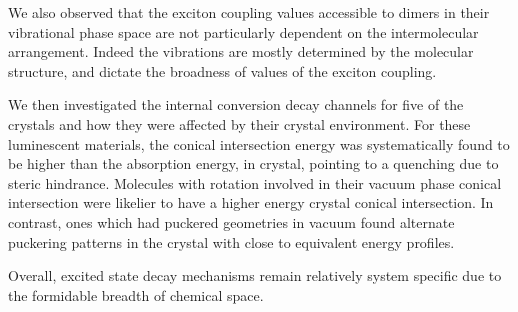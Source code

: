 We also observed that the exciton coupling values accessible to dimers in their vibrational phase space are not particularly dependent on the intermolecular arrangement. Indeed the vibrations are mostly determined by the molecular structure, and dictate the broadness of values of the exciton coupling.

We then investigated the internal conversion decay channels for five of the crystals and how they were affected by their crystal environment. For these luminescent materials, the conical intersection energy was systematically found to be higher than the absorption energy, in crystal, pointing to a quenching due to steric hindrance. Molecules with rotation involved in their vacuum phase conical intersection were likelier to have a higher energy crystal conical intersection. In contrast, ones which had puckered geometries in vacuum found alternate puckering patterns in the crystal with close to equivalent energy profiles. 

Overall, excited state decay mechanisms remain relatively system specific due to the formidable breadth of chemical space.  



